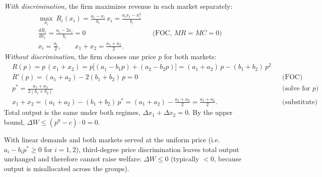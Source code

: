 \emph{With discrimination,} the firm maximizes revenue in each market separately:
\begin{align*}
&\max_{x_i}\ R_i(x_i)=\frac{a_i-x_i}{b_i}\,x_i=\frac{a_ix_i-x_i^2}{b_i}\\
&\frac{dR_i}{dx_i}=\frac{a_i-2x_i}{b_i}=0 &&\text{(FOC, $MR=MC=0$)}\\
&x_i=\frac{a_i}{2},\qquad x_1+x_2=\frac{a_1+a_2}{2}.
\end{align*}
\emph{Without discrimination,} the firm chooses one price $p$ for both markets:
\begin{align*}
&R(p)=p\,(x_1+x_2)=p\big[(a_1-b_1p)+(a_2-b_2p)\big]=(a_1+a_2)\,p-(b_1+b_2)\,p^2\\
&R'(p)=(a_1+a_2)-2(b_1+b_2)\,p=0 &&\text{(FOC)}\\
&p^*=\frac{a_1+a_2}{2(b_1+b_2)} &&\text{(solve for $p$)}\\
&x_1+x_2=(a_1+a_2)-(b_1+b_2)\,p^*=(a_1+a_2)-\frac{a_1+a_2}{2}=\frac{a_1+a_2}{2}. &&\text{(substitute)}
\end{align*}
Total output is the same under both regimes, $\Delta x_1+\Delta x_2=0$. By the upper bound, $\Delta W\le(p^0-c)\cdot 0=0$.

\begin{keybox}[title=Linear demand result]
With linear demands and both markets served at the uniform price (i.e.\ $a_i-b_ip^*\ge 0$ for $i=1,2$), third-degree price discrimination leaves total output unchanged and therefore cannot raise welfare: $\Delta W\le 0$ (typically $<0$, because output is misallocated across the groups).
\end{keybox}
